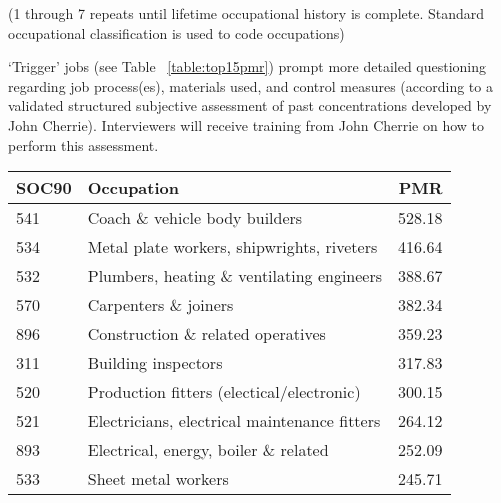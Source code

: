 \documentclass[a4paper,10pt]{article}
\begin{document}
(1 through 7 repeats until lifetime occupational history is complete. Standard occupational classification is used to code occupations)

 `Trigger' jobs (see Table ~\ref{table:top15pmr}) prompt more detailed questioning regarding job process(es), materials used, and control measures (according to a validated structured subjective  assessment of past concentrations developed by John Cherrie). Interviewers will receive training from John Cherrie on how to perform this assessment.

 \begin{table}
         \begin{tabular}{llr}
                 \textbf{SOC90} &                                     \textbf{Occupation} &    \textbf{PMR} \\
                     \midrule
                             541 &                      Coach \& vehicle body builders &  528.18 \\
                                     534 &          Metal plate workers, shipwrights, riveters &  416.64 \\
                                             532 &         Plumbers, heating \& ventilating engineers  &  388.67 \\
                                                     570 &                               Carpenters \& joiners &  382.34 \\ 
                                                             896 &                  Construction \& related operatives &  359.23 \\
                                                                     311 &                                 Building inspectors &  317.83 \\  
                                                                             520 &           Production fitters (electical/electronic) &  300.15 \\
                                                                                     521 &        Electricians, electrical maintenance fitters &  264.12 \\
                                                                                             893 &  Electrical, energy, boiler \& related              &  252.09 \\
                                                                                                     533 &                                 Sheet metal workers &  245.71 \\

\end{tabular}
\end{table}
\end{document}
